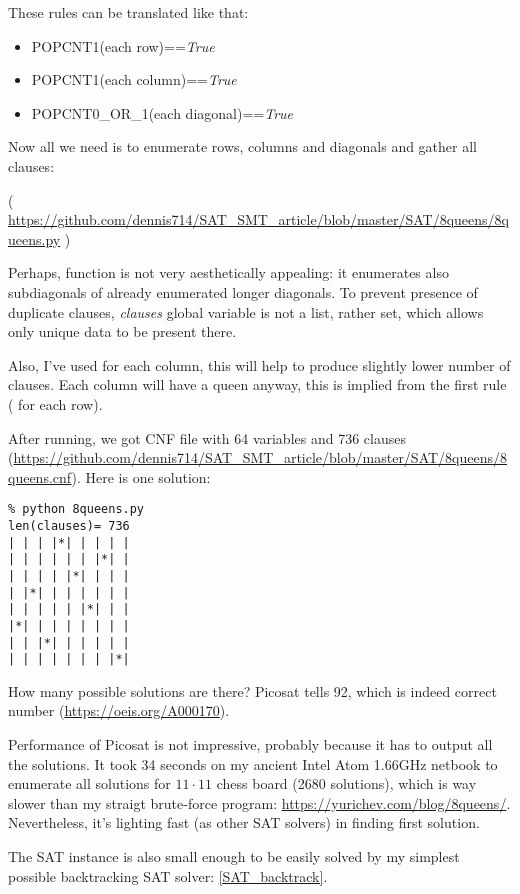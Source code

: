 These rules can be translated like that:

\begin{itemize}
\item POPCNT1(each row)==\textit{True}

\item POPCNT1(each column)==\textit{True}

\item POPCNT0\_OR\_1(each diagonal)==\textit{True}
\end{itemize}

Now all we need is to enumerate rows, columns and diagonals and gather all clauses:


( \url{https://github.com/dennis714/SAT_SMT_article/blob/master/SAT/8queens/8queens.py} )

Perhaps,  function is not very aesthetically appealing: it enumerates also subdiagonals
of already enumerated longer diagonals.
To prevent presence of duplicate clauses, \textit{clauses} global variable is not a list, rather set, which allows
only unique data to be present there.

Also, I've used  for each column, this will help to produce slightly lower number of clauses.
Each column will have a queen anyway, this is implied from the first rule ( for each row).

After running, we got CNF file with 64 variables and 736 clauses (\url{https://github.com/dennis714/SAT_SMT_article/blob/master/SAT/8queens/8queens.cnf}).
Here is one solution:

\begin{lstlisting}
% python 8queens.py
len(clauses)= 736
| | | |*| | | | |
| | | | | | |*| |
| | | | |*| | | |
| |*| | | | | | |
| | | | | |*| | |
|*| | | | | | | |
| | |*| | | | | |
| | | | | | | |*|
\end{lstlisting}

How many possible solutions are there?
Picosat tells 92, which is indeed correct number (\url{https://oeis.org/A000170}).

Performance of Picosat is not impressive, probably because it has to output all the solutions.
It took 34 seconds on my ancient Intel Atom 1.66GHz netbook to enumerate all solutions for $11 \cdot 11$ chess board
(2680 solutions),
which is way slower than my straigt brute-force program: \url{https://yurichev.com/blog/8queens/}.
Nevertheless, it's lighting fast (as other SAT solvers) in finding first solution.

The SAT instance is also small enough to be easily solved by my simplest possible backtracking SAT solver:
\ref{SAT_backtrack}.

